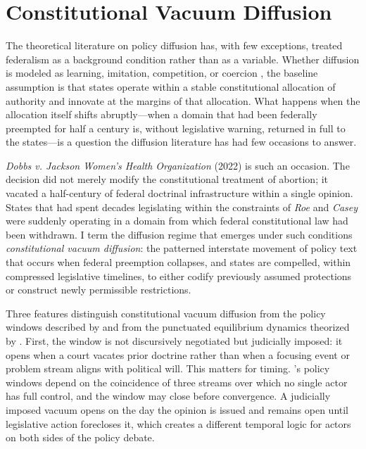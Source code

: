\section{Constitutional Vacuum Diffusion}
\label{sec:cvd}
The theoretical literature on policy diffusion has, with few exceptions, treated federalism as a background condition rather than as a variable. Whether diffusion is modeled as learning, imitation, competition, or coercion \parencite{shipanMechanismsPolicyDiffusion2008a}, the baseline assumption is that states operate within a stable constitutional allocation of authority and innovate at the margins of that allocation. What happens when the allocation itself shifts abruptly---when a domain that had been federally preempted for half a century is, without legislative warning, returned in full to the states---is a question the diffusion literature has had few occasions to answer.

\textit{Dobbs v. Jackson Women's Health Organization} (2022) is such an occasion. The decision did not merely modify the constitutional treatment of abortion; it vacated a half-century of federal doctrinal infrastructure within a single opinion. States that had spent decades legislating within the constraints of \textit{Roe} and \textit{Casey} were suddenly operating in a domain from which federal constitutional law had been withdrawn. I term the diffusion regime that emerges under such conditions \emph{constitutional vacuum diffusion}: the patterned interstate movement of policy text that occurs when federal preemption collapses, and states are compelled, within compressed legislative timelines, to either codify previously assumed protections or construct newly permissible restrictions.

Three features distinguish constitutional vacuum diffusion from the policy windows described by \textcite{kingdonAgendasAlternativesPublic2011a} and from the punctuated equilibrium dynamics theorized by \textcite{baumgartner_jones_1993}. First, the window is not discursively negotiated but judicially imposed: it opens when a court vacates prior doctrine rather than when a focusing event or problem stream aligns with political will. This matters for timing. \textcite{kingdonAgendasAlternativesPublic2011a}'s policy windows depend on the coincidence of three streams over which no single actor has full control, and the window may close before convergence. A judicially imposed vacuum opens on the day the opinion is issued and remains open until legislative action forecloses it, which creates a different temporal logic for actors on both sides of the policy debate.

